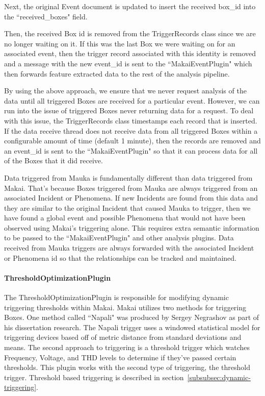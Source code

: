 Next, the original Event document is updated to insert the received box\_id into the ``received\_boxes" field.

Then, the received Box id is removed from the TriggerRecords class since we are no longer waiting on it. If this was the last Box we were waiting on for an associated event, then the trigger record associated with this identity is removed and a message with the new event\_id is sent to the ``MakaiEventPlugin" which then forwards feature extracted data to the rest of the analysis pipeline.

By using the above approach, we ensure that we never request analysis of the data until all triggered Boxes are received for a particular event. However, we can run into the issue of triggered Boxes never returning data for a request. To deal with this issue, the TriggerRecords class timestamps each record that is inserted. If the data receive thread does not receive data from all triggered Boxes within a configurable amount of time (default 1 minute), then the records are removed and an event\_id is sent to the ``MakaiEventPlugin" so that it can process data for all of the Boxes that it did receive.

Data triggered from Mauka is fundamentally different than data triggered from Makai. That's because Boxes triggered from Mauka are always triggered from an associated Incident or Phenomena. If new Incidents are found from this data and they are similar to the original Incident that caused Mauka to trigger, then we have found a global event and possible Phenomena that would not have been observed using Makai's triggering alone. This requires extra semantic information to be passed to the ``MakaiEventPlugin" and other analysis plugins. Data received from Mauka triggers are always forwarded with the associated Incident or Phenomena id so that the relationships can be tracked and maintained.

\paragraph{ThresholdOptimizationPlugin}\label{subsubsec:threshold-optimization-pugin}
The ThresholdOptimizationPlugin is responsible for modifying dynamic triggering thresholds within Makai. Makai utilizes two methods for triggering Boxes. One method called ``Napali" was produced by Sergey Negrashov as part of his dissertation research. The Napali trigger uses a windowed statistical model for triggering devices based off of metric distance from standard deviations and means. The second approach to triggering is a threshold trigger which watches Frequency, Voltage, and THD levels to determine if they've passed certain thresholds. This plugin works with the second type of triggering, the threshold trigger. Threshold based triggering is described in section~\ref{subsubsec:dynamic-triggering}.

